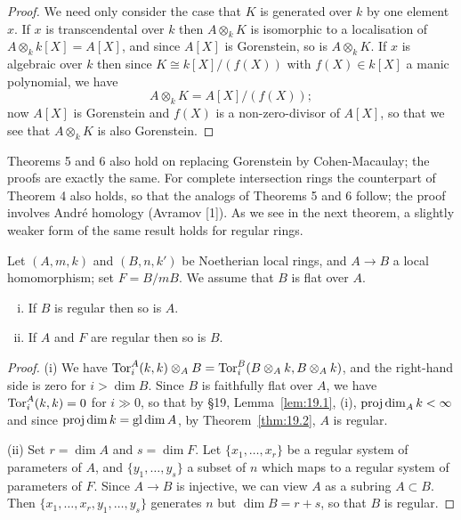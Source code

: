 \begin{proof}
We need only consider the case that $K$ is generated over $k$ by one element $x$.
If $x$ is transcendental over $k$ then $A \otimes_k K$ is isomorphic to a
localisation of $A \otimes_k k[X] = A[X]$, and since $A[X]$ is Gorenstein, so is
$A \otimes_k K$. If $x$ is algebraic over $k$ then since $K \cong k[X]/(f(X))$ with
$f(X) \in k[X]$ a manic polynomial, we have
\[
  A \otimes_k K = A[X]/(f(X));
\]
now $A[X]$ is Gorenstein and $f(X)$ is a non-zero-divisor of $A[X]$, so that we see
that $A \otimes_k K$ is also Gorenstein.
\end{proof}

\begin{remark}
Theorems 5 and 6 also hold on replacing Gorenstein by Cohen-Macaulay; the
proofs are exactly the same. For complete intersection rings the counterpart of
Theorem 4 also holds, so that the analogs of Theorems 5 and 6 follow; the proof
involves Andr\'e homology (Avramov [1]). As we see in the next theorem, a
slightly weaker form of the same result holds for regular rings.
\end{remark}

\begin{theorem}\label{thm:23.7}
Let $(A, m, k)$ and $(B, n, k')$ be Noetherian local rings, and $A \to B$ a local
homomorphism; set $F = B/mB$. We assume that $B$ is flat over $A$.
\begin{enumerate}[(i)]
  \item If $B$ is regular then so is $A$.
  \item If $A$ and $F$ are regular then so is $B$.
\end{enumerate}
\end{theorem}

\begin{proof}
(i) We have $\operatorname{Tor}^A_i(k, k) \otimes_A B = \operatorname{Tor}^B_i(B \otimes_A k, B \otimes_A k)$, and the right-hand
side is zero for $i > \dim B$. Since $B$ is faithfully flat over $A$, we have
$\operatorname{Tor}^A_i(k, k) = 0$ for $i \gg 0$, so that by \S19, Lemma~\ref{lem:19.1}, (i),
$\operatorname{proj\,dim}_A k < \infty$ and since $\operatorname{proj\,dim} k = \operatorname{gl\,dim} A$, by
Theorem~\ref{thm:19.2}, $A$ is regular.

(ii) Set $r = \dim A$ and $s = \dim F$. Let $\{x_1, \ldots, x_r\}$ be a regular system of
parameters of $A$, and $\{y_1, \ldots, y_s\}$ a subset of $n$ which maps to a regular
system of parameters of $F$. Since $A \to B$ is injective, we can view $A$ as a
subring $A \subset B$. Then $\{x_1, \ldots, x_r, y_1, \ldots, y_s\}$ generates $n$ but
$\dim B = r + s$, so that $B$ is regular.
\end{proof}

